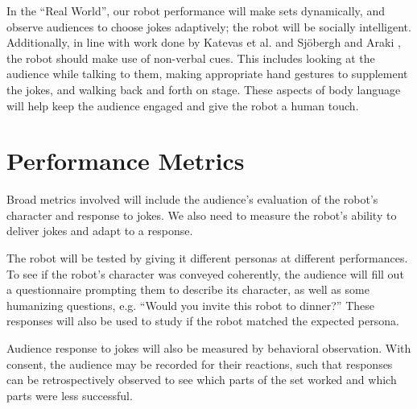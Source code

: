 \documentclass[onecolumn, draftclsnofoot,10pt, compsoc]{IEEEtran}
\begin{document}
In the “Real World”, our robot performance will make sets dynamically, and observe audiences to choose jokes adaptively; the robot will be socially intelligent. Additionally, in line with work done by Katevas et al. {\cite{RobotComedyLab:2015}} and Sj{\"o}bergh and Araki {\cite{RobotsMakeThings:2008}}, the robot should make use of non-verbal cues. This includes looking at the audience while talking to them, making appropriate hand gestures to supplement the jokes, and walking back and forth on stage. These aspects of body language will help keep the audience engaged and give the robot a human touch.


\section{Performance Metrics}

Broad metrics involved will include the audience’s evaluation of the robot’s character and response to jokes. We also need to measure the robot’s ability to deliver jokes and adapt to a response.

The robot will be tested by giving it different personas at different performances. To see if the robot’s character was conveyed coherently, the audience will fill out a questionnaire prompting them to describe its character, as well as some humanizing questions, e.g. “Would you invite this robot to dinner?” These responses will also be used to study if the robot matched the expected persona.

Audience response to jokes will also be measured by behavioral observation. With consent, the audience may be recorded for their reactions, such that responses can be retrospectively observed to see which parts of the set worked and which parts were less successful.



\end{document}
